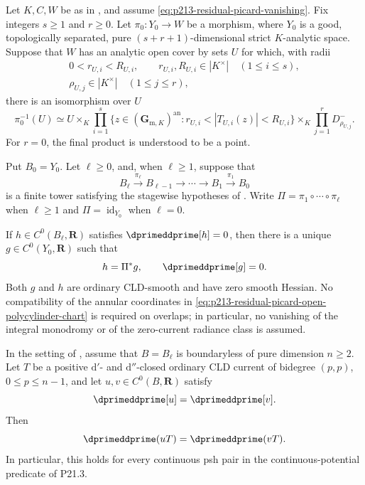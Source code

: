 \begin{theorem}
\label{thm:p213-residual-picard-open-polycylinder-mixed-tower}
Let $K,C,W$ be as in
, and assume
\eqref{eq:p213-residual-picard-vanishing}.  Fix integers $s\geq1$ and
$r\geq0$.  Let $\pi_0:Y_0\to W$ be a morphism, where $Y_0$ is a good,
topologically separated, pure $(s+r+1)$-dimensional strict $K$-analytic
space.  Suppose that $W$ has an analytic open cover by sets $U$ for which,
with radii
\[
 \begin{gathered}
  0<r_{U,i}<R_{U,i},\qquad
  r_{U,i},R_{U,i}\in|K^\times|\quad(1\leq i\leq s),\\
  \rho_{U,j}\in|K^\times|\quad(1\leq j\leq r),
 \end{gathered}
\]
there is an isomorphism over $U$
\begin{equation}
\label{eq:p213-residual-picard-open-polycylinder-chart}
 \pi_0^{-1}(U)\simeq
 U\times_K\prod_{i=1}^s
 \{z\in(\mathbf G_{\mathrm m,K})^{\mathrm{an}}:
              r_{U,i}<|T_{U,i}(z)|<R_{U,i}\}
 \times_K\prod_{j=1}^rD^-_{\rho_{U,j}}.
\end{equation}
For $r=0$, the final product is understood to be a point.

Put $B_0=Y_0$.  Let $\ell\geq0$, and, when $\ell\geq1$, suppose that
\[
 B_\ell\xrightarrow{\pi_\ell}B_{\ell-1}
 \longrightarrow\cdots\longrightarrow B_1
 \xrightarrow{\pi_1}B_0
\]
is a finite tower satisfying the stagewise hypotheses of
.  Write
$\Pi=\pi_1\circ\cdots\circ\pi_\ell$ when $\ell\geq1$ and
$\Pi=\operatorname{id}_{Y_0}$ when $\ell=0$.

If $h\in C^0(B_\ell,\mathbf R)$ satisfies
$\dprimeddprime[h]=0$, then there is a unique
$g\in C^0(Y_0,\mathbf R)$ such that
\[
                    h=\Pi^*g,
                    \qquad \dprimeddprime[g]=0.
\]
Both $g$ and $h$ are ordinary CLD-smooth and have zero smooth Hessian.
No compatibility of the annular coordinates in
\eqref{eq:p213-residual-picard-open-polycylinder-chart} is required on
overlaps; in particular, no vanishing of the integral monodromy or of the
zero-current radiance class is assumed.
\end{theorem}

\begin{corollary}
\label{cor:p213-residual-picard-open-polycylinder-mixed-tower-bt}
In the setting of
, assume that
$B=B_\ell$ is boundaryless of pure dimension $n\geq2$.  Let $T$ be a
positive $\mathrm d'$- and $\mathrm d''$-closed ordinary CLD current of
bidegree $(p,p)$, $0\leq p\leq n-1$, and let
$u,v\in C^0(B,\mathbf R)$ satisfy
\[
                         \dprimeddprime[u]=\dprimeddprime[v].
\]
Then
\[
                         \dprimeddprime(uT)=\dprimeddprime(vT).
\]
In particular, this holds for every continuous psh pair in the
continuous-potential predicate of P21.3.
\end{corollary}

